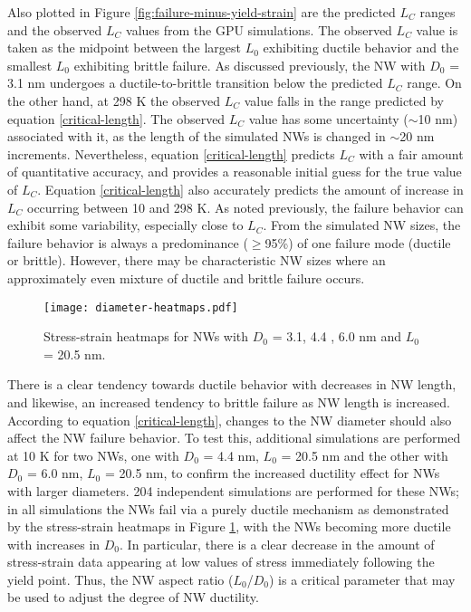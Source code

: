 \documentclass[10pt]{report}  %
\begin{document}
Also plotted in Figure \ref{fig:failure-minus-yield-strain} are the predicted $L_{C}$ ranges and the observed $L_{C}$ values from the GPU simulations. The observed $L_{C}$ value is taken as the midpoint between the largest $L_{0}$ exhibiting ductile behavior and the smallest $L_{0}$ exhibiting brittle failure. As discussed previously, the NW with $D_{0}$ = 3.1 nm undergoes a ductile-to-brittle transition below the predicted $L_{C}$ range. On the other hand, at 298 K the observed $L_{C}$ value falls in the range predicted by equation \ref{critical-length}. The observed $L_{C}$ value has some uncertainty ($\sim$10 nm) associated with it, as the length of the simulated NWs is changed in $\sim$20 nm increments. Nevertheless, equation \ref{critical-length} predicts $L_{C}$ with a fair amount of quantitative accuracy, and provides a reasonable initial guess for the true value of $L_{C}$. Equation \ref{critical-length} also accurately predicts the amount of increase in $L_{C}$ occurring between 10 and 298 K. As noted previously, the failure behavior can exhibit some variability, especially close to $L_{C}$. From the simulated NW sizes, the failure behavior is always a predominance ($\ge$95\%) of one failure mode (ductile or brittle). However, there may be characteristic NW sizes where an approximately even mixture of ductile and brittle failure occurs. 

\begin{figure}[h!]
       \centering
	\texttt{[image: diameter-heatmaps.pdf]}
	\caption{Stress-strain heatmaps for NWs with $D_{0}$ = 3.1, 4.4 , 6.0 nm and $L_{0}$ = 20.5 nm.   }
	\label{fig:diameter-heatmaps}
\end{figure}

There is a clear tendency towards ductile behavior with decreases in NW length, and likewise, an increased tendency to brittle failure as NW length is increased. According to equation \ref{critical-length}, changes to the NW diameter should also affect the NW failure behavior. To test this, additional simulations are performed at 10 K for two NWs, one with $D_{0}$ = 4.4 nm, $L_{0}$ = 20.5 nm and the other with $D_{0}$ = 6.0 nm, $L_{0}$ = 20.5 nm, to confirm the increased ductility effect for NWs with larger diameters. 204 independent simulations are performed for these NWs; in all simulations the NWs fail via a purely ductile mechanism as demonstrated by the stress-strain heatmaps in Figure \ref{fig:diameter-heatmaps}, with the NWs becoming more ductile with increases in $D_{0}$. In particular, there is a clear decrease in the amount of stress-strain data appearing at low values of stress immediately following the yield point. Thus, the NW aspect ratio ($L_{0}$/$D_{0}$) is a critical parameter that may be used to adjust the degree of NW ductility.
\end{document}
